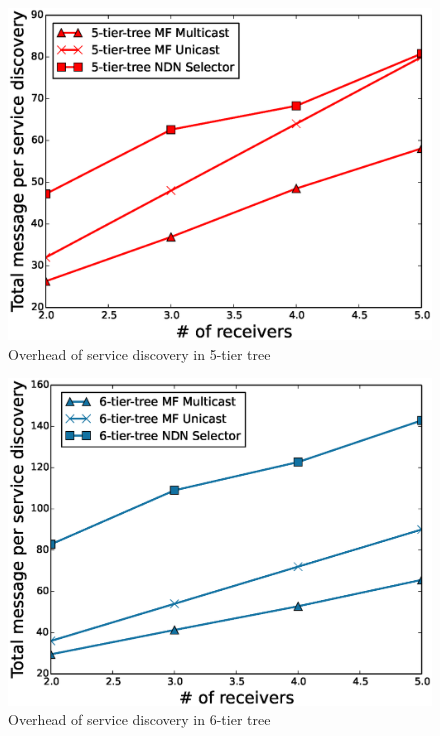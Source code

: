 \begin{figure}
\includegraphics[width=\columnwidth]{figure/5_service_discovery_overhead.eps}
\caption{\label{fig:5_service_over}Overhead of service discovery in 5-tier tree}
\end{figure}

\begin{figure}
\includegraphics[width=\columnwidth]{figure/6_service_discovery_overhead.eps}
\caption{\label{fig:6_service_over}Overhead of service discovery in 6-tier tree}
\end{figure}

